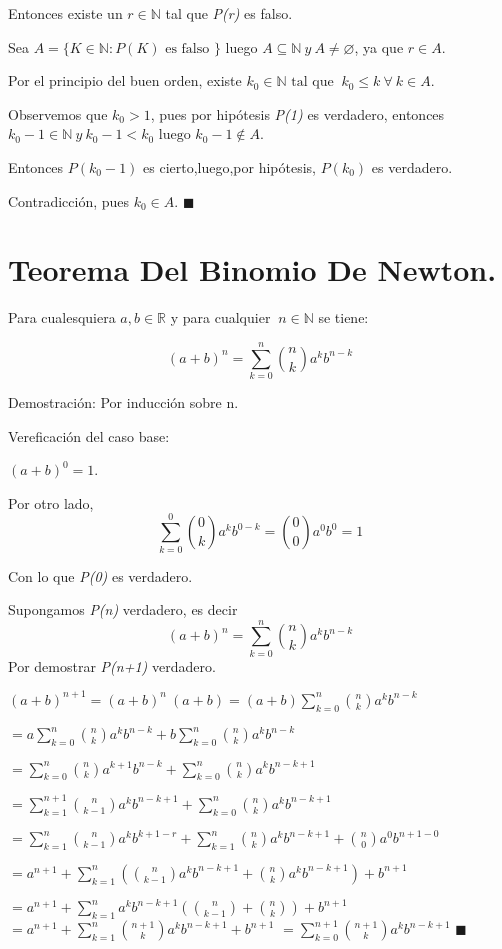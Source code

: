 \documentclass[12pt]{book}
\newcommand\R{{\mathbb R}}
\newcommand\N{{\mathbb N}}
\begin{document}
Entonces existe un $r\in{\mathbb{N}}$ tal que \textit{P(r)} es falso.

Sea $A=\lbrace K\in{\mathbb{N}}:P(K)\mbox{ es falso }\rbrace$ luego $A\subseteq{\mathbb{N}} \ y \ A\neq{\varnothing}$, ya que $r\in{A}$.

Por el principio del buen orden, existe $k_{0}\in{\mathbb{N}}\mbox{ tal que } \ k_{0}\le{k} \ \forall \ k\in{A}$.

Observemos que $k_{0}>1$, pues por hipótesis \textit{P(1)} es verdadero, entonces $k_{0}-1\in{\mathbb{N}} \ y \ k_{0}-1<k_{0}\mbox{ luego }k_{0}-1\not\in{A}$.

Entonces $P(k_{0}-1)$ es cierto,luego,por hipótesis, $P(k_{0})$ es verdadero.

Contradicción, pues $k_{0}\in{A}$. $\blacksquare$

\section{Teorema Del Binomio De Newton.}
Para cualesquiera $a,b\in\R$ y para cualquier $\ n\in\N$ se tiene:

$$(a+b)^n=\sum_{k=0}^n \binom{n}{k} a^kb^{n-k}$$

Demostración: Por inducción sobre n.

Vereficación del caso base:

$(a+b)^0=1$.

Por otro lado, $$\sum_{k=0}^0 \binom{0}{k} a^kb^{0-k}=\binom{0}{0}a^0b^0=1$$

Con lo que \textit{P(0)} es verdadero.

Supongamos \textit{P(n)} verdadero, es decir $$(a+b)^n=\sum_{k=0}^n \binom{n}{k} a^kb^{n-k}$$
Por demostrar \textit{P(n+1)} verdadero.

$(a+b)^{n+1}=(a+b)^n \ (a+b)=(a+b) \sum_{k=0}^n \binom{n}{k} a^kb^{n-k}$

$=a\sum_{k=0}^n \binom{n}{k} a^kb^{n-k}+b\sum_{k=0}^n \binom{n}{k} a^kb^{n-k}$

$=\sum_{k=0}^n \binom{n}{k} a^{k+1}b^{n-k}+\sum_{k=0}^n \binom{n}{k} a^kb^{n-k+1}$

$=\sum_{k=1}^{n+1} \binom{n}{k-1} a^kb^{n-k+1}+\sum_{k=0}^n \binom{n}{k} a^kb^{n-k+1}$

$=\sum_{k=1}^n \binom{n}{k-1} a^kb^{k+1-r}+\sum_{k=1}^n \binom{n}{k} a^kb^{n-k+1}+\binom{n}{0}a^0b^{n+1-0}$

$=a^{n+1}+\sum_{k=1}^n(\binom{n}{k-1} a^kb^{n-k+1}+\binom{n}{k} a^kb^{n-k+1})+b^{n+1}$

$=a^{n+1}+\sum_{k=1}^n a^kb^{n-k+1}(\binom{n}{k-1}+\binom{n}{k})+b^{n+1}$
$=a^{n+1}+\sum_{k=1}^n \binom{n+1}{k}a^kb^{n-k+1}+b^{n+1}$
$=\sum_{k=0}^{n+1} \binom{n+1}{k}a^kb^{n-k+1}$ $\blacksquare$
\end{document}
